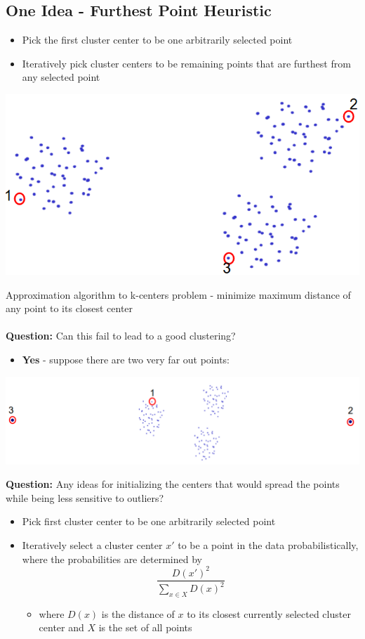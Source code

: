 \documentclass[10pt]{article}
\begin{document}
\subsection*{One Idea - Furthest Point Heuristic}
\begin{itemize}
    \item Pick the first cluster center to be one arbitrarily selected point
    \item Iteratively pick cluster centers to be remaining points that are furthest from any selected point
\end{itemize}
\begin{center}
    \includegraphics[width=\textwidth]{W6_26.png}
\end{center}
Approximation algorithm to k-centers problem - minimize maximum distance of any point to its closest center\\\\
\textbf{Question:} Can this fail to lead to a good clustering?
\begin{itemize}
    \item \textbf{Yes} - suppose there are two very far out points:
\end{itemize}
\begin{center}
    \includegraphics*[width=\textwidth]{W6_27.png}
\end{center}
\textbf{Question:} Any ideas for initializing the centers that would spread the points while being less sensitive to outliers?
\begin{itemize}
    \item Pick first cluster center to be one arbitrarily selected point
    \item Iteratively select a cluster center $x'$ to be a point in the data probabilistically, where the probabilities are determined by
    \[\frac{D(x')^2}{\sum_{x \in X} D(x)^2}\]
    \begin{itemize}
        \item where $D(x)$ is the distance of $x$ to its closest currently selected cluster center and $X$ is the set of all points
    \end{itemize}
\end{itemize}
\end{document}
